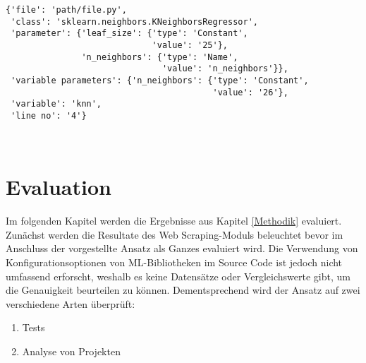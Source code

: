 \documentclass[german,bachelor]{swsLeipzig}
\begin{document}
\noindent\begin{minipage}{\linewidth}
\begin{lstlisting}[frame=single, label=final_dict, basicstyle=\small, caption={Dictionary-Eintrag der KNeighborsRegressor-Klasse mit möglichen Parameterwerten},captionpos=b]
{'file': 'path/file.py',
 'class': 'sklearn.neighbors.KNeighborsRegressor',
 'parameter': {'leaf_size': {'type': 'Constant',
                             'value': '25'},
               'n_neighbors': {'type': 'Name',
                               'value': 'n_neighbors'}},
 'variable parameters': {'n_neighbors': {'type': 'Constant',
                                         'value': '26'},
 'variable': 'knn',
 'line no': '4'}
\end{lstlisting}
\end{minipage}
\


\chapter{Evaluation}\label{Evaluation}
Im folgenden Kapitel werden die Ergebnisse aus Kapitel \ref{Methodik} evaluiert.
Zunächst werden die Resultate des Web Scraping-Moduls beleuchtet bevor im Anschluss der vorgestellte Ansatz
als Ganzes evaluiert wird.
Die Verwendung von Konfigurationsoptionen von ML-Bibliotheken im Source Code ist jedoch nicht umfassend erforscht,
weshalb es keine Datensätze oder Vergleichswerte gibt, um die Genauigkeit beurteilen zu können.
Dementsprechend wird der Ansatz auf zwei verschiedene Arten überprüft:
\begin{enumerate}
 \item Tests
 \item Analyse von Projekten
\end{enumerate}
\end{document}
